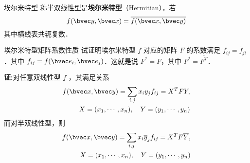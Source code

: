 
\begin{definition}{埃尔米特型}
称半双线性型是\textbf{埃尔米特型}（Hermitian），若
\begin{equation}
f(\bvec y,\bvec x)=\overline{f(\bvec x,\bvec y)}
\end{equation}
其中横线表共轭复数．
\end{definition}
\begin{example}{埃尔米特型矩阵系数性质}
试证明埃尔米特型 $f$ 对应的矩阵 $F$ 的系数满足 $f_{ij}=\overline f_{ji}$．其中 $f_{ij}=f(\bvec e_i,\bvec e_j)$．这就是说 $F^*=F$，其中 $F^*=\overline {F^T}$．

\textbf{证:}对任意双线性型 $f$ ，其满足关系
\begin{equation}
\begin{aligned}
f(\bvec x,\bvec y)=\sum_{i,j}x_i y_j f_{ij}=X^TFY,\\
X=(x_1,\cdots,x_n),\quad Y=(y_1,\cdots,y_n)
\end{aligned}
\end{equation}
而对半双线性型，则
\begin{equation}
\begin{aligned}
f(\bvec x,\bvec y)=\sum_{i,j}x_i \overline y_j f_{ij}=X^TF\overline Y,\\
X=(x_1,\cdots,x_n),\quad Y=(y_1,\cdots,y_n)
\end{aligned}
\end{equation}

\end{example}
